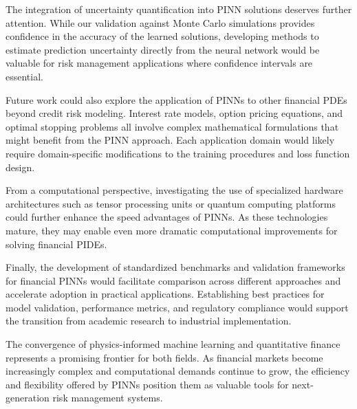 \documentclass[11pt,twoside,openright]{report}
\begin{document}
The integration of uncertainty quantification into PINN solutions deserves further attention. While our validation against Monte Carlo simulations provides confidence in the accuracy of the learned solutions, developing methods to estimate prediction uncertainty directly from the neural network would be valuable for risk management applications where confidence intervals are essential.

Future work could also explore the application of PINNs to other financial PDEs beyond credit risk modeling. Interest rate models, option pricing equations, and optimal stopping problems all involve complex mathematical formulations that might benefit from the PINN approach. Each application domain would likely require domain-specific modifications to the training procedures and loss function design.

From a computational perspective, investigating the use of specialized hardware architectures such as tensor processing units or quantum computing platforms could further enhance the speed advantages of PINNs. As these technologies mature, they may enable even more dramatic computational improvements for solving financial PIDEs.

Finally, the development of standardized benchmarks and validation frameworks for financial PINNs would facilitate comparison across different approaches and accelerate adoption in practical applications. Establishing best practices for model validation, performance metrics, and regulatory compliance would support the transition from academic research to industrial implementation.

The convergence of physics-informed machine learning and quantitative finance represents a promising frontier for both fields. As financial markets become increasingly complex and computational demands continue to grow, the efficiency and flexibility offered by PINNs position them as valuable tools for next-generation risk management systems.
\end{document}
